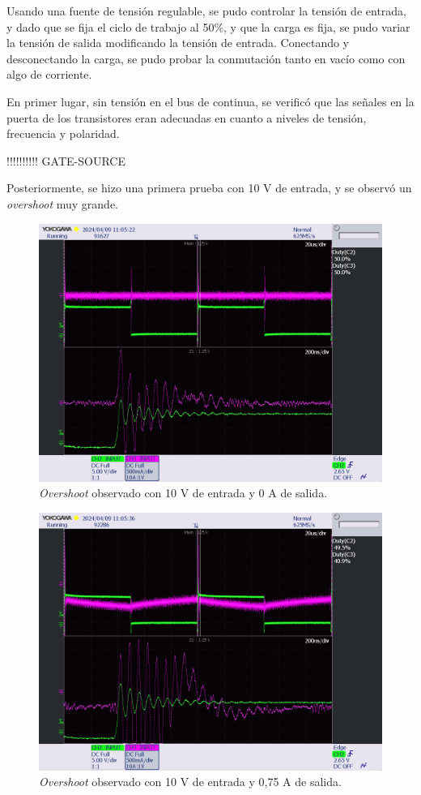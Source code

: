 Usando una fuente de tensión regulable, se pudo controlar la tensión de entrada, y dado que se fija el ciclo de trabajo al 50\%, y que la carga es fija, se pudo variar la tensión de salida modificando la tensión de entrada. Conectando y desconectando la carga, se pudo probar la conmutación tanto en vacío como con algo de corriente.


En primer lugar, sin tensión en el bus de continua, se verificó que las señales en la puerta de los transistores eran adecuadas en cuanto a niveles de tensión, frecuencia y polaridad.

!!!!!!!!!! GATE-SOURCE


Posteriormente, se hizo una primera prueba con 10 V de entrada, y se observó un \textit{overshoot} muy grande.

\begin{figure}[H]
	\centering
	\includegraphics[width=0.7\linewidth]{fig/overshootInicial1}
	\caption{\textit{Overshoot} observado con 10 V de entrada y 0 A de salida.}
\end{figure}

\begin{figure}[H]
	\centering
	\includegraphics[width=0.7\linewidth]{fig/overshootInicial2}
	\caption{\textit{Overshoot} observado con 10 V de entrada y 0,75 A de salida.}
\end{figure}

